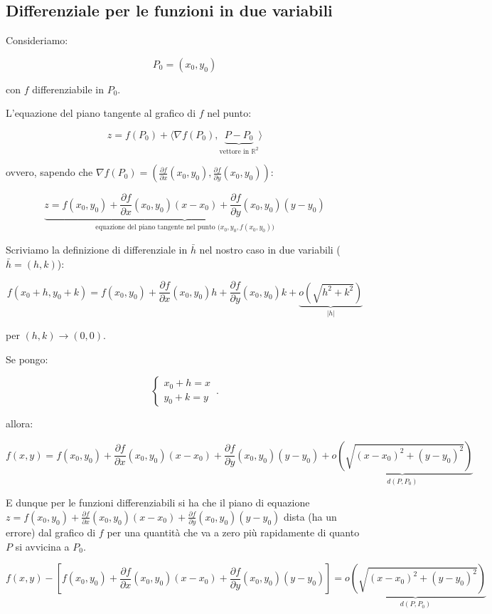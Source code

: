 \documentclass[../appunti-analisi.tex]{subfiles}
\begin{document}
\subsection{Differenziale per le funzioni in due variabili} 

Consideriamo:

\[
    P_0 = (x_0,y_0)
\]

con $f$ differenziabile in $P_0$.

L'equazione del piano tangente al grafico di $f$ nel punto:

\[
    z= f(P_0) + \langle \nabla f(P_0), \underbrace{P-P_0}_\text{vettore in $\mathbb{R}^{2}$} \rangle
\]

ovvero, sapendo che $\nabla f(P_0) = ( \frac{\partial f}{\partial x}(x_0,y_0), \frac{\partial f}{\partial y}(x_0,y_0))$:

\[
    \underbrace{z = f(x_0,y_0) + \frac{\partial f}{\partial x}(x_0,y_0) (x-x_0) + \frac{\partial f}{\partial y}(x_0,y_0) (y-y_0)}_\text{equazione del piano tangente nel punto ($x_0,y_0,f(x_0,y_0)$)}
\]


Scriviamo la definizione di differenziale in $\bar{h} $ nel nostro caso in due variabili ($\bar{h} =(h,k)$):

\[
    f(x_0+h,y_0+k) = f(x_0,y_0) + \frac{\partial f}{\partial x}(x_0,y_0) h + \frac{\partial f}{\partial y}(x_0,y_0) k + \underbrace{o(\sqrt{h^{2}+k^{2}})}_\text{$|h|$}
\]

per $(h,k) \rightarrow  (0,0)$.

Se pongo:

\begin{equation}
    \begin{cases}
           x_0+h = x\\
           y_0+ k = y
    \end{cases}\,.
\end{equation}

allora:

\[
    f(x,y) = f(x_0,y_0) + \frac{\partial f}{\partial x}(x_0,y_0) (x-x_0) + \frac{\partial f}{\partial y}(x_0,y_0) (y-y_0) + \underbrace{o(\sqrt{(x-x_0)^{2}+(y-y_0)^{2}})}_\text{$d(P,P_0)$}
\]

E dunque per le funzioni differenziabili si ha che il piano di equazione $z= f(x_0,y_0) + \frac{\partial f}{\partial x}(x_0,y_0)(x-x_0) + \frac{\partial f}{\partial y}(x_0,y_0) (y-y_0)$ dista (ha un errore) dal grafico di $f$ per una quantità che va a zero più rapidamente di quanto $P$ si avvicina a $P_0$.

\[
    f(x,y) - [f(x_0,y_0) + \frac{\partial f}{\partial x}(x_0,y_0) (x-x_0) + \frac{\partial f}{\partial y}(x_0,y_0) (y-y_0)] = \underbrace{o(\sqrt{(x-x_0)^{2}+(y-y_0)^{2}})}_\text{$d(P,P_0)$}
\]
\end{document}
